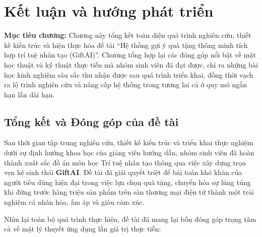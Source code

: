 
\chapter{Kết luận và hướng phát triển}
\label{chap:chuong7}

\begin{infobox}
\textbf{Mục tiêu chương:}
Chương này tổng kết toàn diện quá trình nghiên cứu, thiết kế kiến trúc và hiện thực hóa đề tài ``Hệ thống gợi ý quà tặng thông minh tích hợp trí tuệ nhân tạo (GiftAI)''. Chương tổng hợp lại các đóng góp nổi bật về mặt học thuật và kỹ thuật thực tiễn mà nhóm sinh viên đã đạt được, chỉ ra những bài học kinh nghiệm sâu sắc thu nhận được sau quá trình triển khai, đồng thời vạch ra lộ trình nghiên cứu và nâng cấp hệ thống trong tương lai cả ở quy mô ngắn hạn lẫn dài hạn.
\end{infobox}

\section{Tổng kết và Đóng góp của đề tài}

Sau thời gian tập trung nghiên cứu, thiết kế kiến trúc và triển khai thực nghiệm dưới sự định hướng khoa học của giảng viên hướng dẫn, nhóm sinh viên đã hoàn thành xuất sắc đồ án môn học Trí tuệ nhân tạo thông qua việc xây dựng trọn vẹn hệ sinh thái \textbf{GiftAI}. Đề tài đã giải quyết triệt để bài toán khó khăn của người tiêu dùng hiện đại trong việc lựa chọn quà tặng, chuyển hóa sự lúng túng khi đứng trước hàng triệu sản phẩm trên sàn thương mại điện tử thành một trải nghiệm cá nhân hóa, ấm áp và giàu cảm xúc.

Nhìn lại toàn bộ quá trình thực hiện, đề tài đã mang lại bốn đóng góp trọng tâm cả về mặt lý thuyết ứng dụng lẫn giá trị thực tiễn:

